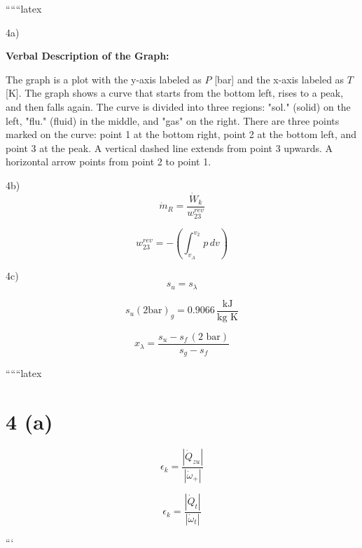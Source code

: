 
``````latex


4a) 

\textbf{Verbal Description of the Graph:}

The graph is a plot with the y-axis labeled as \( P \) [bar] and the x-axis labeled as \( T \) [K]. The graph shows a curve that starts from the bottom left, rises to a peak, and then falls again. The curve is divided into three regions: "sol." (solid) on the left, "flu." (fluid) in the middle, and "gas" on the right. There are three points marked on the curve: point 1 at the bottom right, point 2 at the bottom left, and point 3 at the peak. A vertical dashed line extends from point 3 upwards. A horizontal arrow points from point 2 to point 1.

4b) 
\[
\dot{m}_R = \frac{\dot{W}_k}{w_{23}^{rev}}
\]

\[
w_{23}^{rev} = - \left( \int_{v_A}^{v_2} p \, dv \right)
\]

4c) 
\[
s_u = s_\lambda
\]

\[
s_u (2 \text{bar})_g = 0.9066 \, \frac{\text{kJ}}{\text{kg K}}
\]

\[
x_\lambda = \frac{s_u - s_f \, (\text{2 bar})}{s_g - s_f}
\]

``````latex


\section*{4 (a)}

\[
\epsilon_k = \frac{\left| \dot{Q}_{zu} \right|}{\left| \dot{\omega}_+ \right|}
\]

\[
\epsilon_k = \frac{\left| \dot{Q}_t \right|}{\left| \dot{\omega}_t \right|}
\]

```